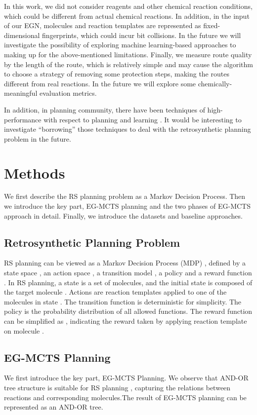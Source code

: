 \documentclass[sn-mathphys,Numbered]{sn-jnl}
\begin{document}
In this work, we did not consider reagents and other chemical reaction conditions, which could be different from actual chemical reactions. 
In addition, in the input of our EGN, molecules and reaction templates are represented as fixed-dimensional fingerprints, which could incur bit collisions. In the future we will investigate the possibility of exploring machine learning-based approaches to making up for the above-mentioned limitations. Finally, we measure route quality by the length of the route, which is relatively simple and may cause the algorithm to choose a strategy of removing some protection steps, making the routes different from real reactions. In the future we will explore some chemically-meaningful evaluation metrics.

In addition, in planning community, there have been techniques of high-performance with respect to planning and learning \citet{DBLP:journals/ai/ZhuoK17,DBLP:journals/ai/Zhuo014,DBLP:journals/ai/ZhuoM014,DBLP:journals/ai/ZhuoYHL10,DBLP:conf/aaai/ShenZXZP20}. It would be interesting to investigate ``borrowing'' those techniques to deal with the retrosynthetic planning problem in the future.


\section{Methods}
We first describe the RS planning problem as a Markov Decision Process. Then we introduce the key part, EG-MCTS planning and the two phases of EG-MCTS approach in detail. Finally, we introduce the datasets and baseline approaches.

\subsection{Retrosynthetic Planning Problem}
RS planning can be viewed as a Markov Decision Process (MDP) \cite{MDP}, defined by a state space , an action space , a transition model , a policy  and a reward function . In RS planning, a state  is a set of molecules, and the initial state  is composed of the target molecule . Actions are reaction templates applied to one of the molecules  in state . 
The transition function  is deterministic for simplicity. The policy  is the probability distribution of all allowed functions. The reward function  can be simplified as , indicating the reward taken by applying reaction template  on molecule .

\subsection{EG-MCTS Planning}
We first introduce the key part, EG-MCTS Planning.
We observe that AND-OR tree structure is suitable for RS planning \citep{aaai12,DFPN-E2019,retro2020,2022}, capturing the relations between reactions and corresponding molecules.The result of EG-MCTS planning can be represented as an AND-OR tree.
\end{document}
